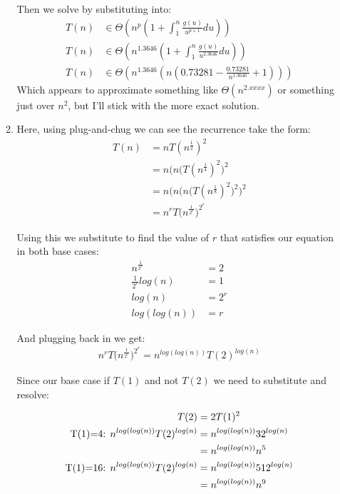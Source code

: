 \documentclass[11pt,a4paper]{article}
\begin{document}
\begin{enumerate}
\begin{enumerate}
			Then we solve by substituting into:
			\begin{align*}
				T(n) &\in \Theta(n^p (1 + \int_{1}^{n} \frac{g(u)}{u^{p+1}} du)) \\
				T(n) &\in \Theta(n^{1.3646} (1 + \int_{1}^{n} \frac{g(u)}{u^{2.3646}} du)) \\
				T(n) &\in \Theta(n^{1.3646} (n(0.73281 - \frac{0.73281}{n^{1.3646}} + 1)))
			\end{align*}
			Which appears to approximate something like $\Theta(n^{2.xxxx})$ or something just over $n^2$, but I'll stick with the more exact solution.
			\item Here, using plug-and-chug we can see the recurrence take the form:
			\begin{align*}
				T(n) &= nT(n^{\frac{1}{2}})^2 \\
				&= n\big(n(T(n^{\frac{1}{4}})^2\big)^2 \\
				&= n\Big(n\big(n(T(n^{\frac{1}{8}})^2\big)^2\Big)^2 \\
				&= n^r T\Big(n^\frac{1}{2^r}\Big)^{2^r}
			\end{align*}
			
			Using this we substitute to find the value of $r$ that satisfies our equation in both base cases:
			\begin{align*}
				n^{\frac{1}{2^r}} &= 2 \\
				\frac{1}{2^r} log(n) &= 1 \\
				log(n) &= 2^r \\
				log (log (n)) &= r
			\end{align*}
			
			And plugging back in we get:
			\begin{align*}
			n^r T\Big(n^\frac{1}{2^r}\Big)^{2^r} = n^{log(log(n))}T(2)^{log(n)}
			\end{align*}
			
			Since our base case if $T(1)$ and not $T(2)$ we need to substitute and resolve:
			
			\begin{align*}
			T(2) &= 2T(1)^2 \\
			\text{T(1)=4:\space} n^{log(log(n))}T(2)^{log(n)} &= n^{log(log(n))}32^{log(n)}\\
			&= n^{log(log(n))}n^5\\
			\text{T(1)=16:\space} n^{log(log(n))}T(2)^{log(n)} &= n^{log(log(n))}512^{log(n)}\\
			&= n^{log(log(n))}n^9\\
			\end{align*}
			

\end{enumerate}
\end{enumerate}
\end{document}
